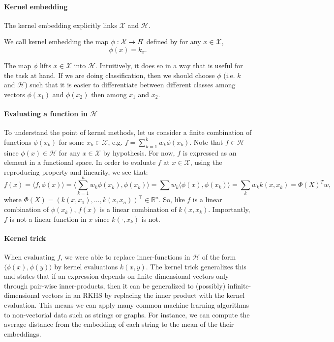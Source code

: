 \paragraph{Kernel embedding}
The kernel embedding explicitly links $\mathcal X$ and $\mathcal H$.
\begin{mdframed}
\begin{definition}
We call kernel embedding the map $\phi: \mathcal X \to \mathbb \mathcal H$ defined by for any $x\in\mathcal X$,
$$ \phi(x) = k_x.$$
\end{definition}
\end{mdframed}

The map $\phi$ lifts $x\in\mathcal X$ into $\mathcal H$. Intuitively, it does so in a way that is useful for the task at hand. If we are doing classification, then we should choose $\phi$ (i.e. $k$ and $\mathcal H$) such that it is easier to differentiate between different classes among vectors $\phi(x_1)$ and $\phi(x_2)$ then among $x_1$ and $x_2$. %

\paragraph{Evaluating a function in $\mathcal H$}
To understand the point of kernel methods, let us consider a finite combination of functions $\phi(x_k)$ for some $x_k\in\mathcal X$, e.g. $f= \sum_{k=1}^k w_k \phi(x_k)$. Note that $f\in\mathcal H$ since $\phi(x)\in\mathcal H$ for any $x\in\mathcal X$ by hypothesis. For now, $f$ is expressed as an element in a functional space. In order to evaluate $f$ at $x\in\mathcal X$, using the reproducing property and linearity, we see that:
$$f(x) = \langle f, \phi(x)\rangle = \langle \sum_{k=1}^n w_k\phi(x_k), \phi(x_k)\rangle= \sum w_k \langle \phi(x), \phi(x_k)\rangle = \sum_{k}w_k k(x, x_k)= \Phi(X)^Tw,$$
where $\Phi(X) = (k(x, x_1), \ldots, k(x, x_n))^\top\in\mathbb R^n$. So, like $f$ is a linear combination of $\phi(x_k)$, $f(x)$ is a linear combination of $k(x, x_k)$. Importantly, $f$ is not a linear function in $x$ since $k(\cdot, x_k)$ is not.

\paragraph{Kernel trick}
When evaluating $f$, we were able to replace inner-functions in $\mathcal H$ of the form $\langle \phi(x), \phi(y)\rangle$ by kernel evaluations $k(x, y)$. The kernel trick generalizes this and states that if an expression depends on finite-dimensional vectors only through pair-wise inner-products, then it can be generalized to (possibly) infinite-dimensional vectors in an RKHS by replacing the inner product with the kernel evaluation. This means we can apply many common machine learning algorithms to non-vectorial data such as strings or graphs. For instance, we can compute the average distance from the embedding of each string to the mean of the their embeddings.

